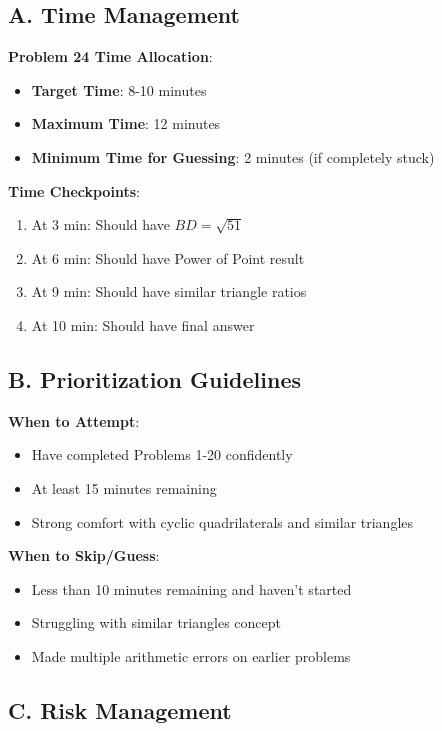 \documentclass[]{article}
\begin{document}
\begin{competitionbox}
\subsection*{A. Time Management}

\textbf{Problem 24 Time Allocation}:
\begin{itemize}[leftmargin=*]
    \item \textbf{Target Time}: 8-10 minutes
    \item \textbf{Maximum Time}: 12 minutes
    \item \textbf{Minimum Time for Guessing}: 2 minutes (if completely stuck)
\end{itemize}

\textbf{Time Checkpoints}:
\begin{enumerate}
    \item At 3 min: Should have $BD = \sqrt{51}$
    \item At 6 min: Should have Power of Point result
    \item At 9 min: Should have similar triangle ratios
    \item At 10 min: Should have final answer
\end{enumerate}

\subsection*{B. Prioritization Guidelines}

\textbf{When to Attempt}:
\begin{itemize}[leftmargin=*]
    \item Have completed Problems 1-20 confidently
    \item At least 15 minutes remaining
    \item Strong comfort with cyclic quadrilaterals and similar triangles
\end{itemize}

\textbf{When to Skip/Guess}:
\begin{itemize}[leftmargin=*]
    \item Less than 10 minutes remaining and haven't started
    \item Struggling with similar triangles concept
    \item Made multiple arithmetic errors on earlier problems
\end{itemize}

\subsection*{C. Risk Management}


\end{competitionbox}
\end{document}
